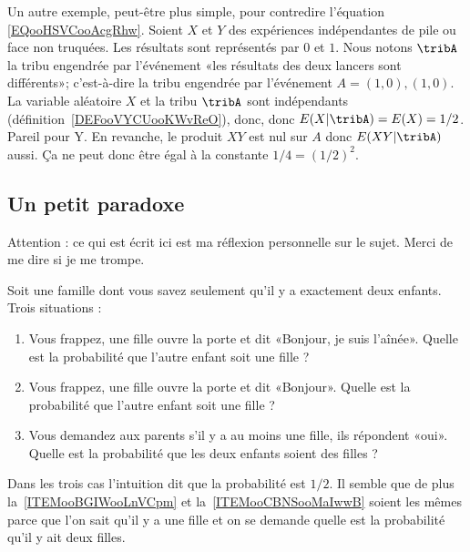 \begin{example}
    Un autre exemple, peut-être plus simple, pour contredire l'équation \eqref{EQooHSVCooAcgRhw}. Soient \( X\) et \( Y\) des expériences indépendantes de pile ou face non truquées. Les résultats sont représentés par \( 0\) et \( 1\). Nous notons $\tribA$  la tribu engendrée par l'événement «les résultats des deux lancers sont différents»; c'est-à-dire la tribu engendrée par l'événement $A={(1,0),(1,0)}$. La variable aléatoire \( X\) et la tribu \( \tribA\) sont indépendants (définition~\ref{DEFooVYCUooKWvReO}), donc, donc $E(X|\tribA)=E(X)=1/2$. Pareil pour Y. En revanche, le produit $XY$ est nul sur $A$ donc $E(XY|\tribA)$ aussi. Ça ne peut donc être égal à la constante $1/4=(1/2)^2$.
\end{example}

\subsection{Un petit paradoxe}
\label{subSecGXVYooTDdZaB}

Attention : ce qui est écrit ici est ma réflexion personnelle sur le sujet. Merci de me dire si je me trompe.

Soit une famille dont vous savez seulement qu'il y a exactement deux enfants. Trois situations :
\begin{enumerate}
    \item       \label{ITEMooNUPAooWCXwBE}
        Vous frappez, une fille ouvre la porte et dit «Bonjour, je suis l'aînée». Quelle est la probabilité que l'autre enfant soit une fille ?
    \item   \label{ITEMooBGIWooLnVCpm}
        Vous frappez, une fille ouvre la porte et dit «Bonjour». Quelle est la probabilité que l'autre enfant soit une fille ?
    \item       \label{ITEMooCBNSooMaIwwB}
        Vous demandez aux parents s'il y a au moins une fille, ils répondent «oui». Quelle est la probabilité que les deux enfants soient des filles ?
\end{enumerate}
Dans les trois cas l'intuition dit que la probabilité est \( 1/2\). Il semble que de plus la~\ref{ITEMooBGIWooLnVCpm} et la~\ref{ITEMooCBNSooMaIwwB} soient les mêmes parce que l'on sait qu'il y a une fille et on se demande quelle est la probabilité qu'il y ait deux filles.

